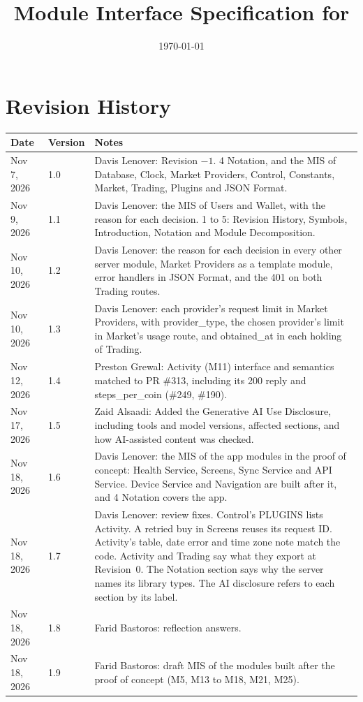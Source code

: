 \documentclass[12pt, titlepage]{article}
\begin{document}
\title{Module Interface Specification for \progname{}}

\author{\authname}

\date{\today}

\maketitle


\section{Revision History}

\begin{tabularx}{\textwidth}{p{3cm}p{2cm}X}
\toprule {\bf Date} & {\bf Version} & {\bf Notes}\\
\midrule
Nov 7, 2026 & 1.0 & Davis Lenover: Revision $-1$. 4 Notation, and the MIS of
Database, Clock, Market Providers, Control, Constants, Market, Trading, Plugins
and JSON Format.\\
Nov 9, 2026 & 1.1 & Davis Lenover: the MIS of Users and Wallet, with the reason
for each decision. 1 to 5: Revision History, Symbols, Introduction, Notation and
Module Decomposition.\\
Nov 10, 2026 & 1.2 & Davis Lenover: the reason for each decision in every other
server module, Market Providers as a template module, error handlers in JSON
Format, and the 401 on both Trading routes.\\
Nov 10, 2026 & 1.3 & Davis Lenover: each provider's request limit in Market
Providers, with provider\_type, the chosen provider's limit in Market's usage
route, and obtained\_at in each holding of Trading.\\
Nov 12, 2026 & 1.4 & Preston Grewal: Activity (M11) interface and semantics
matched to PR \#313, including its 200 reply and steps\_per\_coin
(\#249, \#190).\\
Nov 17, 2026 & 1.5 & Zaid Alsaadi: Added the Generative AI Use
Disclosure, including tools and model versions, affected sections,
and how AI-assisted content was checked.\\
Nov 18, 2026 & 1.6 & Davis Lenover: the MIS of the app modules in the proof
of concept: Health Service, Screens, Sync Service and API Service. Device
Service and Navigation are built after it, and 4 Notation covers the app.\\
Nov 18, 2026 & 1.7 & Davis Lenover: review fixes. Control's PLUGINS lists
Activity. A retried buy in Screens reuses its request ID. Activity's table,
date error and time zone note match the code. Activity and Trading say what
they export at Revision~0. The Notation section says why the server names its
library types. The AI disclosure refers to each section by its label.\\
Nov 18, 2026 & 1.8 & Farid Bastoros: reflection answers.\\
Nov 18, 2026 & 1.9 & Farid Bastoros: draft MIS of the modules built after
the proof of concept (M5, M13 to M18, M21, M25).\\
\bottomrule
\end{tabularx}
\end{document}
